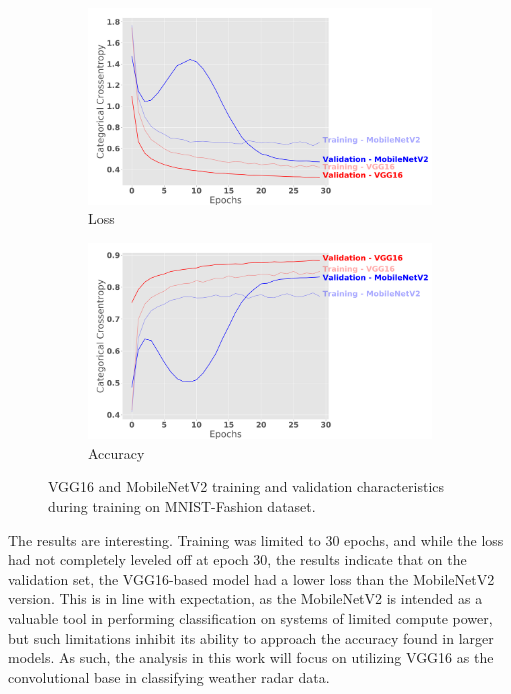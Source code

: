 \begin{figure}[ht]
	\centering
	\begin{subfigure}[b]{\textwidth}
		\includegraphics[width=\textwidth]{./thesis_code/plots/train-val-loss_two-nets_three-channels-duplicated.png}
		\caption{Loss}
		\label{fig:classifying_conv_bases_loss}
	\end{subfigure}
	\begin{subfigure}[b]{\textwidth}
		\includegraphics[width=\textwidth]{./thesis_code/plots/train-val-acc_two-nets_three-channels-duplicated.png}
		\caption{Accuracy}
		\label{fig:classifying_conv_bases_accuracy}
	\end{subfigure}
	\caption{VGG16 and MobileNetV2 training and validation characteristics during training on MNIST-Fashion dataset.}
	\label{fig:classifying_conv_bases}
\end{figure}

The results are interesting. Training was limited to 30 epochs, and while the loss had not completely leveled off at epoch 30, the results indicate that on the validation set, the VGG16-based model had a lower loss than the MobileNetV2 version.
This is in line with expectation, as the MobileNetV2 is intended as a valuable tool in performing classification on systems of limited compute power, but such limitations inhibit its ability to approach the accuracy found in larger models.
As such, the analysis in this work will focus on utilizing VGG16 as the convolutional base in classifying weather radar data.

